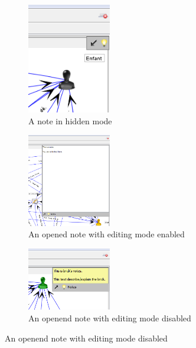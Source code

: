 \begin{figure}[h!]
\centering
\begin{subfigure}{\textwidth}

\centering
\includegraphics[width=0.4\textwidth]{images/note_fermee.png}
\caption{A note in hidden mode}
\end{subfigure}
\begin{subfigure}{\textwidth}

\centering
\includegraphics[width=0.4\textwidth]{images/note_ouverte_edition.png}
\caption{An opened note with editing mode enabled}
\end{subfigure}
\begin{subfigure}{\textwidth}

\centering
\includegraphics[width=0.4\textwidth]{images/note_ouverte_pas_edition.png}
\caption{An openend note with editing mode disabled}
\end{subfigure}

\end{figure}

